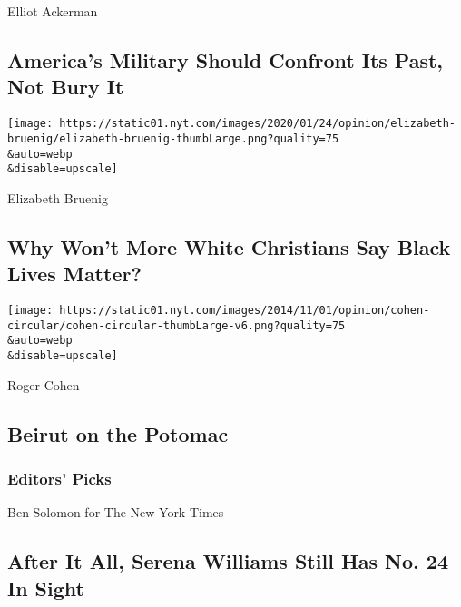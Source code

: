Elliot Ackerman

\hypertarget{americas-military-should-confront-its-past-not-bury-it}{%
\subsection{America's Military Should Confront Its Past, Not Bury
It}\label{americas-military-should-confront-its-past-not-bury-it}}

\href{/2020/08/06/opinion/sunday/gloria-purvis-george-floyd-blm.html}{}

\texttt{[image: https://static01.nyt.com/images/2020/01/24/opinion/elizabeth-bruenig/elizabeth-bruenig-thumbLarge.png?quality=75\\\&auto=webp\\\&disable=upscale]}

Elizabeth Bruenig

\hypertarget{why-wont-more-white-christians-say-black-lives-matter}{%
\subsection{Why Won't More White Christians Say Black Lives
Matter?}\label{why-wont-more-white-christians-say-black-lives-matter}}

\href{/2020/08/07/opinion/beirut-explosion.html}{}

\texttt{[image: https://static01.nyt.com/images/2014/11/01/opinion/cohen-circular/cohen-circular-thumbLarge-v6.png?quality=75\\\&auto=webp\\\&disable=upscale]}

Roger Cohen

\hypertarget{beirut-on-the-potomac}{%
\subsection{Beirut on the Potomac}\label{beirut-on-the-potomac}}

\hypertarget{editors-picks}{%
\subsubsection{Editors' Picks}\label{editors-picks}}

\href{/2020/08/07/sports/tennis/serena-williams-us-open.html}{}

Ben Solomon for The New York Times

\href{/2020/08/07/sports/tennis/serena-williams-us-open.html}{}

\hypertarget{after-it-all-serena-williams-still-has-no-24-in-sight}{%
\subsection{After It All, Serena Williams Still Has No. 24 In
Sight}\label{after-it-all-serena-williams-still-has-no-24-in-sight}}

